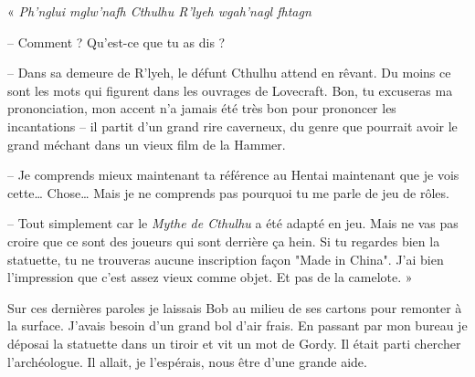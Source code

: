 « \emph{Ph’nglui mglw’nafh Cthulhu R’lyeh wgah’nagl fhtagn}

-- Comment ? Qu'est-ce que tu as dis ?

-- Dans sa demeure de R'lyeh, le défunt Cthulhu attend en rêvant. Du moins ce sont les mots qui figurent dans les
ouvrages de Lovecraft. Bon, tu excuseras ma prononciation, mon accent n'a jamais été très bon pour prononcer les
incantations -- il partit d'un grand rire caverneux, du genre que pourrait avoir le grand méchant dans un vieux film de
la Hammer.

-- Je comprends mieux maintenant ta référence au Hentai maintenant que je vois cette\ldots{} Chose\ldots{} Mais je ne
comprends pas pourquoi tu me parle de jeu de rôles.

-- Tout simplement car le \emph{Mythe de Cthulhu} a été adapté en jeu. Mais ne vas pas croire que ce sont des joueurs
qui sont derrière ça hein. Si tu regardes bien la statuette, tu ne trouveras aucune inscription façon "Made in China".
J'ai bien l'impression que c'est assez vieux comme objet. Et pas de la camelote. »

Sur ces dernières paroles je laissais Bob au milieu de ses cartons pour remonter à la surface. J'avais besoin d'un grand
bol d'air frais. En passant par mon bureau je déposai la statuette dans un tiroir et vit un mot de Gordy. Il était parti
chercher l'archéologue. Il allait, je l'espérais, nous être d'une grande aide.
